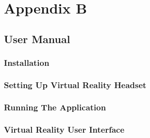 \section*{Appendix B}

\subsection*{User Manual}

\subsubsection*{Installation}

\subsubsection*{Setting Up Virtual Reality Headset}

\subsubsection*{Running The Application}

\subsubsection*{Virtual Reality User Interface}